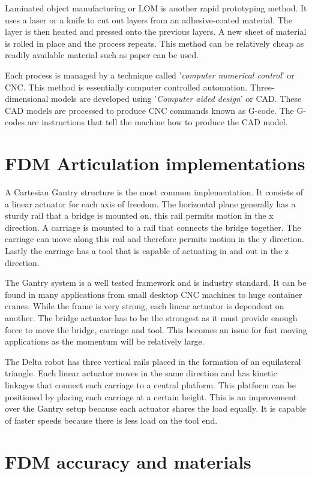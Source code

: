 \documentclass[a4paper, 11pt, twoside]{Thesis}  %
\begin{document}
Laminated object manufacturing or LOM is another rapid prototyping method. It uses a laser or a knife to cut out layers from an adhesive-coated material. The layer is then heated and pressed onto the previous layers. A new sheet of material is rolled in place and the process repeats. This method can be relatively cheap as readily available material such as paper can be used.

Each process is managed by a technique called '\textit{computer numerical control}' or CNC. This method is essentially computer controlled automation. Three-dimensional models are developed using '\textit{Computer aided design}' or CAD. These CAD models are processed to produce CNC commands known as G-code. The G-codes are instructions that tell the  machine how to produce the CAD model.
\section{FDM Articulation implementations}

A Cartesian Gantry structure is the most common implementation. It consists of a linear actuator for each axis of freedom. The horizontal plane generally has a sturdy rail that a bridge is mounted on, this rail permits motion in the x direction. A carriage is mounted to a rail that connects the bridge together. The carriage can move along this rail and therefore permits motion in the y direction. Lastly the carriage has a tool that is capable of actuating in and out in the z direction.

The Gantry system is a well tested framework and is industry standard. It can be found in many applications from small desktop CNC machines to huge container cranes. While the frame is very strong, each linear actuator is dependent on another. The bridge actuator has to be the strongest as it must provide enough force to move the bridge, carriage and tool. This becomes an issue for fast moving applications as the momentum will be relatively large.

The Delta robot has three vertical rails placed in the formation of an equilateral triangle. Each linear actuator moves in the same direction and has kinetic linkages that connect each carriage to a central platform. This platform can be positioned by placing each carriage at a certain height. This is an improvement over the Gantry setup because each actuator shares the load equally. It is capable of faster speeds because there is less load on the tool end.
\section{FDM accuracy and materials}
\end{document}
